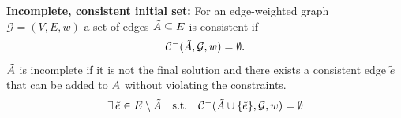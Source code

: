     

\begin{definition}
\textbf{Incomplete, consistent initial set:}\label{def:initialset}
For an edge-weighted graph $\mathcal{G} = (V, E, w)$  a set of edges $\tilde{A} \subseteq E$ is consistent if
\begin{equation}
    \mathcal{C}^{-}(\tilde{A}, \mathcal{G}, w) = \emptyset.
\end{equation}
$\tilde{A}$ is incomplete if it is not the final solution and there exists a consistent edge $\tilde{e}$ that can be added to $\tilde{A}$ without violating the constraints.
    \begin{equation}
 \exists\, \tilde{e} \in E \setminus \tilde{A} \quad \textrm{s.t.} \quad  \mathcal{C}^{-}(\tilde{A} \cup \{\tilde{e}\}, \mathcal{G}, w) = \emptyset
\end{equation}
\end{definition}

